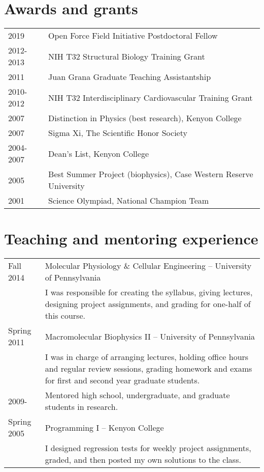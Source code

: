 \documentclass[letterpaper,11pt]{article}
\begin{document}
\section{Awards and grants}
\begin{tabular}{ll}
2019 & Open Force Field Initiative Postdoctoral Fellow \\
2012-2013 & NIH T32 Structural Biology Training Grant\\
2011 & Juan Grana Graduate Teaching Assistantship\\
2010-2012 & NIH T32 Interdisciplinary Cardiovascular Training Grant\\
2007 & Distinction in Physics (best research), Kenyon College\\
2007 & Sigma Xi, The Scientific Honor Society\\
2004-2007 & Dean's List, Kenyon College\\
2005 & Best Summer Project (biophysics), Case Western Reserve University\\
2001 & Science Olympiad, National Champion Team
\end{tabular}

\section{Teaching and mentoring experience}
\begin{tabular}{lp{16cm}}
Fall 2014 & Molecular Physiology \& Cellular Engineering -- University of Pennsylvania\\ & 
I was responsible for creating the syllabus, giving lectures, designing project assignments, 
and grading for one-half of this course.\\

Spring 2011 & Macromolecular Biophysics II -- University of
Pennsylvania\\ & I was in charge of arranging lectures, holding office
hours and regular review sessions, grading homework and exams for
first and second year graduate students.\\ 
2009- & Mentored high school, undergraduate, and graduate students in research. \\
Spring 2005 & Programming I
-- Kenyon College\\ & I designed regression tests for weekly project
assignments, graded, and then posted my own solutions to the class.
\end{tabular}
\end{document}
